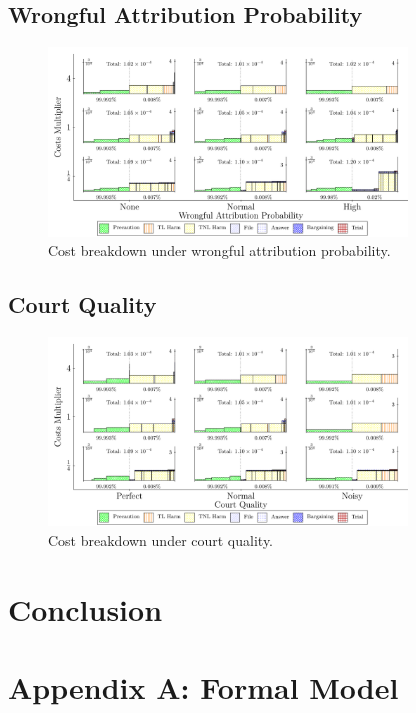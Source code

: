 \documentclass{article}
\begin{document}
\subsection{Wrongful Attribution Probability}
\begin{figure}[ht]
  \centering
  \includegraphics[width=0.85\textwidth]{../Figures/Cost Breakdown Wrongful Attribution Probability (All Rows).pdf}
  \caption{Cost breakdown under wrongful attribution probability.}
  \label{fig:wrongful_attr}
\end{figure}

\FloatBarrier
\subsection{Court Quality}
\begin{figure}[ht]
  \centering
  \includegraphics[width=0.85\textwidth]{../Figures/Cost Breakdown Court Quality (All Rows).pdf}
  \caption{Cost breakdown under court quality.}
  \label{fig:court_quality}
\end{figure}

\section{Conclusion}

\section*{Appendix A: Formal Model}
\end{document}
